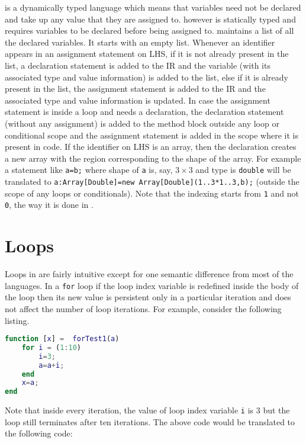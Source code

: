 \matlab is a dynamically typed language which means that variables need
not be declared and take up any value that they are assigned to. \xten
however is statically typed and requires variables to be declared before
being assigned to. \mixten maintains a list of all the declared
variables. It starts with an empty list. Whenever an identifier appears
in an assignment statement on LHS, if it is not already present in the
list, a declaration statement is added to the \xten IR and the variable
(with its associated type and value information) is added to the list,
else if it is already present in the list, the assignment statement is
added to the \xten IR and the associated type and value information is
updated. In case the \matlab assignment statement is inside a loop and
needs a declaration, the declaration statement (without any assignment)
is added to the method block outside any loop or conditional scope and
the assignment statement is added in the scope where it is present in
\matlab code. If the identifier on LHS is an array, then the declaration
creates a new array with the region corresponding to the shape of the
array. For example a \matlab statement like \verb|a=b;| where shape of
\verb|a| is, say, $3\times3$ and type is \verb|double| will be
translated to \verb|a:Array[Double]=new Array[Double](1..3*1..3,b);|
(outside the scope of any loops or conditionals).  Note that the
indexing starts from \verb|1| and not \verb|0|, the way it is done in
\matlab.       

\section{Loops}

Loops in \matlab are fairly intuitive except for one semantic difference
from most of the languages. In a \verb|for| loop if the loop index
variable is redefined inside the body of the loop then its new value is
persistent only in a particular iteration and does not affect the number
of loop iterations. For example, consider the following listing.

\begin{lstlisting}[language=Matlab,numbers=none]
function [x] =  forTest1(a)
    for i = (1:10)
        i=3;
        a=a+i;
    end
    x=a;
end
\end{lstlisting}

\noindent 
Note that inside every iteration, the value of loop index
variable \verb|i| is 3 but the loop still terminates after ten
iterations. The above code would be translated to the following \xten
code:

